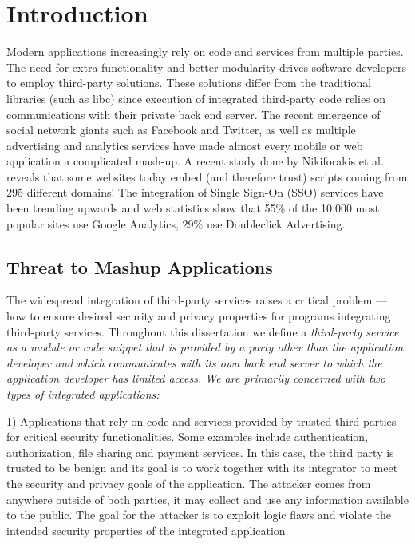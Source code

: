 \chapter{Introduction}
\label{ch:intro}

Modern applications increasingly rely on code and services from multiple parties.  The need for extra functionality and better modularity drives software developers to employ third-party solutions.  These solutions differ from the traditional libraries (such as libc) since execution of integrated third-party code relies on communications with their private back end server.  The recent emergence of social network giants such as Facebook and Twitter, as well as multiple advertising and analytics services have made almost every mobile or web application a complicated mash-up.  A recent study done by Nikiforakis et al.~\cite{Nikiforakis:2012:YYI:2382196.2382274} reveals that some websites today embed (and therefore trust) scripts coming from 295 different domains!  The integration of Single Sign-On (SSO) services have been trending upwards and web statistics show that 55\% of the 10,000 most popular sites use Google Analytics, 29\% use Doubleclick Advertising.

\section{Threat to Mashup Applications}

The widespread integration of third-party services raises a critical problem --- how to ensure desired security and privacy properties for programs integrating third-party services.  Throughout this dissertation we define a \em third-party service \em as a module or code snippet that is provided by a party other than the application developer and which communicates with its own back end server to which the application developer has limited access.  We are primarily concerned with two types of integrated applications:  

1) Applications that rely on code and services provided by trusted third parties for critical security functionalities.  Some examples include authentication, authorization, file sharing and payment services.  In this case, the third party is trusted to be benign and its goal is to work together with its integrator to meet the security and privacy goals of the application.  The attacker comes from anywhere outside of both parties, it may collect and use any information available to the public.  The goal for the attacker is to exploit logic flaws and violate the intended security properties of the integrated application.  

